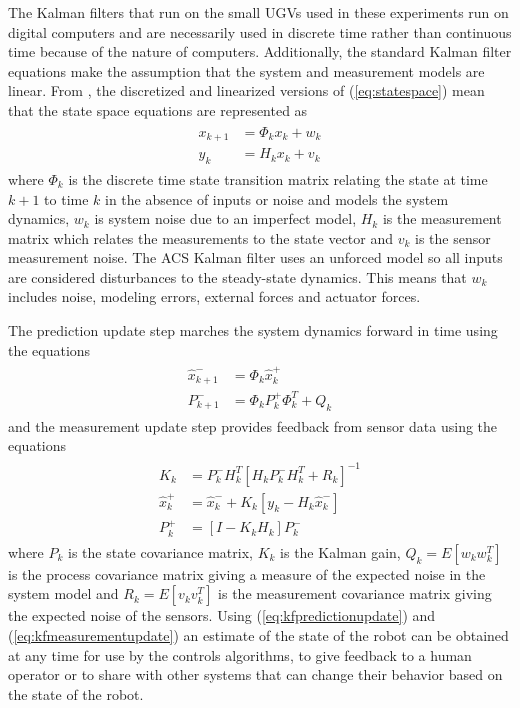 The Kalman filters that run on the small UGVs used in these experiments run on digital computers and are necessarily used in discrete time rather than continuous time because of the nature of computers. Additionally, the standard Kalman filter equations make the assumption that the system and measurement models are linear. From \cite{Kelly_1994_338}, \cite{Simon06OptimalEstimation} the discretized and linearized versions of (\ref{eq:statespace}) mean that the state space equations are represented as
\begin{align*}
\begin{split}
x_{k+1} &= \Phi_kx_k + w_k \\
y_k &= H_kx_k + v_k
\end{split}
\end{align*}
where $\Phi_k$ is the discrete time state transition matrix relating the state at time $k+1$ to time $k$ in the absence of inputs or noise and models the system dynamics, $w_k$ is system noise due to an imperfect model, $H_k$ is the measurement matrix which relates the measurements to the state vector and $v_k$ is the sensor measurement noise. The ACS Kalman filter uses an unforced model so all inputs are considered disturbances to the steady-state dynamics. This means that $w_k$ includes noise, modeling errors, external forces and actuator forces.

The prediction update step marches the system dynamics forward in time using the equations
\begin{align}
\label{eq:kfpredictionupdate}
\begin{split}
\hat{x}_{k+1}^- &= \Phi_k\hat{x}_k^+ \\
P_{k+1}^- &= \Phi_kP_k^+\Phi_k^T + Q_k
\end{split}
\end{align}
and the measurement update step provides feedback from sensor data using the equations
\begin{align}
\label{eq:kfmeasurementupdate}
\begin{split}
K_k &= P_k^-H_k^T\left[H_kP_k^-H_k^T + R_k\right]^{-1} \\
\hat{x}_k^+ &= \hat{x}_k^- + K_k\left[y_k - H_k\hat{x}_k^-\right] \\
P_k^+ &= \left[I - K_kH_k\right]P_k^-
\end{split}
\end{align}
where $P_k$ is the state covariance matrix, $K_k$ is the Kalman gain, $Q_k = E[w_kw_k^T]$ is the process covariance matrix giving a measure of the expected noise in the system model and $R_k = E[v_kv_k^T]$ is the measurement covariance matrix giving the expected noise of the sensors. Using (\ref{eq:kfpredictionupdate}) and (\ref{eq:kfmeasurementupdate}) an estimate of the state of the robot can be obtained at any time for use by the controls algorithms, to give feedback to a human operator or to share with other systems that can change their behavior based on the state of the robot.


